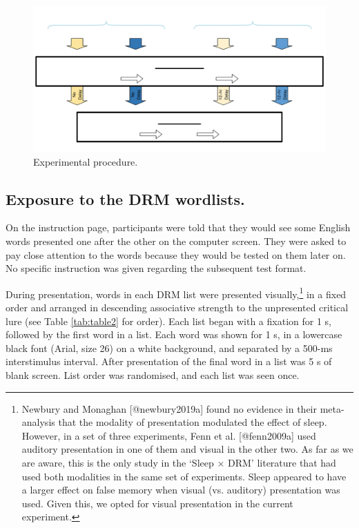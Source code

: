 \documentclass[
]{article}
\begin{document}
\begin{figure}

{\centering \includegraphics{Figures/expprocedure} 

}

\caption{Experimental procedure.}\label{fig:expprocedure}
\end{figure}

\hypertarget{exposure-to-the-drm-wordlists.}{%
\subsection{Exposure to the DRM wordlists.}\label{exposure-to-the-drm-wordlists.}}

On the instruction page, participants were told that they would see some English words presented one after the other on the computer screen. They were asked to pay close attention to the words because they would be tested on them later on. No specific instruction was given regarding the subsequent test format.

During presentation, words in each DRM list were presented visually,\footnote{Newbury and Monaghan [@newbury2019a] found no evidence in their meta-analysis that the modality of presentation modulated the effect of sleep. However, in a set of three experiments, Fenn et al. [@fenn2009a] used auditory presentation in one of them and visual in the other two. As far as we are aware, this is the only study in the ‘Sleep $\times$ DRM’ literature that had used both modalities in the same set of experiments. Sleep appeared to have a larger effect on false memory when visual (vs. auditory) presentation was used. Given this, we opted for visual presentation in the current experiment.} in a fixed order and arranged in descending associative strength to the unpresented critical lure (see Table \ref{tab:table2} for order). Each list began with a fixation for 1 s, followed by the first word in a list. Each word was shown for 1 s, in a lowercase black font (Arial, size 26) on a white background, and separated by a 500-ms interstimulus interval. After presentation of the final word in a list was 5 s of blank screen. List order was randomised, and each list was seen once.
\end{document}
